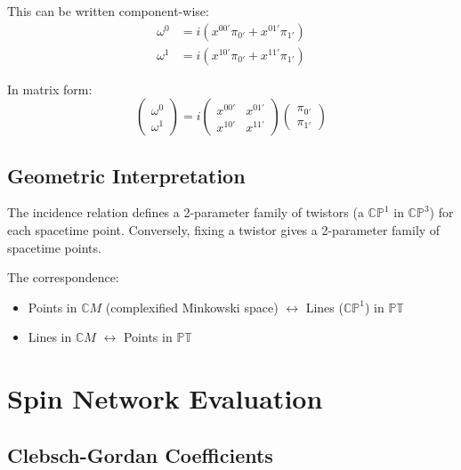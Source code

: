 \documentclass[12pt,a4paper]{article}
\theoremstyle{definition}
\newcommand{\C}{\mathbb{C}}
\newcommand{\CP}{\mathbb{CP}}
\begin{document}
This can be written component-wise:
\begin{align}
\omega^0 &= i(x^{00'}\pi_{0'} + x^{01'}\pi_{1'}) \\
\omega^1 &= i(x^{10'}\pi_{0'} + x^{11'}\pi_{1'})
\end{align}

In matrix form:
\begin{equation}
\begin{pmatrix} \omega^0 \\ \omega^1 \end{pmatrix} = 
i\begin{pmatrix} x^{00'} & x^{01'} \\ x^{10'} & x^{11'} \end{pmatrix}
\begin{pmatrix} \pi_{0'} \\ \pi_{1'} \end{pmatrix}
\end{equation}

\subsection{Geometric Interpretation}

The incidence relation defines a 2-parameter family of twistors (a $\CP^1$ in $\CP^3$) for each spacetime point. Conversely, fixing a twistor gives a 2-parameter family of spacetime points.

\begin{tcolorbox}[colback=blue!5,colframe=blue!75!black,title=Key Insight]
The correspondence:
\begin{itemize}
    \item Points in $\C M$ (complexified Minkowski space) $\leftrightarrow$ Lines ($\CP^1$) in $\mathbb{PT}$
    \item Lines in $\C M$ $\leftrightarrow$ Points in $\mathbb{PT}$
\end{itemize}
\end{tcolorbox}

\section{Spin Network Evaluation}

\subsection{Clebsch-Gordan Coefficients}
\end{document}
